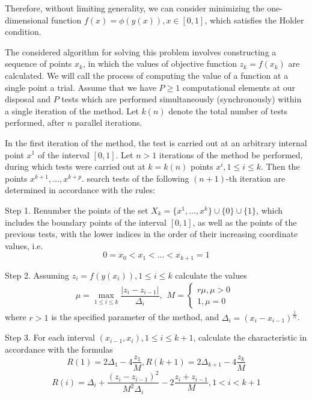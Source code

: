 \documentclass{svproc}
\begin{document}
Therefore, without limiting generality, we can consider minimizing the one-dimensional function \(f(x)=\phi(y(x)), x\in[0,1]\), which satisfies the Holder condition.

The considered algorithm for solving this problem involves constructing a sequence of points \(x_k\), in which the values of objective function \(z_k = f(x_k)\) are calculated. We will call the process of computing the value of a function at a single point a trial. Assume that we have \(P\geqslant 1\) computational elements at our disposal and \(P\) tests which are performed simultaneously (synchronously) within a single iteration of the method. Let \(k(n)\) denote the total number of tests performed, after \(n\) parallel iterations.

In the first iteration of the method, the test is carried out at an arbitrary internal point \(x^1\) of the interval \([0,1]\). Let \(n>1\) iterations of the method be performed, during which tests were carried out at \(k = k(n)\) points \(x^i, 1\leqslant i\leqslant k\). Then the points  \(x^{k+1},\dotsc,x^{k+p}\). search tests of the following \((n+1)\)-th iteration are determined in accordance with the rules:

Step 1. Renumber the points of the set \(X_k=\{x^1,\dotsc,x^k\}\cup\{0\}\cup\{1\}\), which includes the boundary points of the interval \([0,1]\), as well as the points of the previous tests, with the lower indices in the order of their increasing coordinate values, i.e.
\begin{displaymath}
0=x_0<x_1<\dotsc<x_{k+1}=1
\end{displaymath}

Step 2. Assuming \(z_i=f(y(x_i)),1\leqslant i\leqslant k\) calculate the values
\begin{displaymath}
\label{step2}
\mu=\max_{1\leqslant i\leqslant k}\dfrac{|z_i-z_{i-1}|}{\Delta_i},
\begin{matrix}
    M = 
    \left\{
    \begin{matrix}
    r\mu,\mu>0 \\
    1,\mu=0
    \end{matrix} \right.
    \end{matrix}
\end{displaymath}
where \(r > 1\) is the specified parameter of the method, and \(\Delta_i=(x_i-x_{i-1})^\frac{1}{N}\). 

Step 3. For each interval \((x_{i-1},x_i),1\leqslant i\leqslant k+1\), calculate the characteristic in accordance with the formulas 
\begin{displaymath}
\label{step3_1}
R(1)=2\Delta_1-4\dfrac{z_1}{M},R(k+1)=2\Delta_{k+1}-4\dfrac{z_k}{M}
\end{displaymath}
\begin{displaymath}
\label{step3_2}
R(i)=\Delta_i+\dfrac{(z_i-z_{i-1})^2}{M^2\Delta_i}-2\dfrac{z_i+z_{i-1}}{M},1<i<k+1
\end{displaymath}
\end{document}
